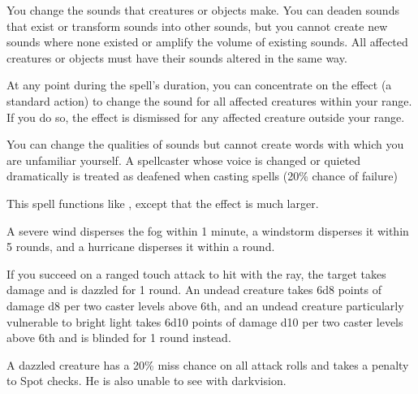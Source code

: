 \spellrng{\rngmed}
\begin{spelleffect}
  You change the sounds that creatures or objects make. You can deaden sounds that exist or transform sounds into other sounds, but you cannot create new sounds where none existed or amplify the volume of existing sounds. All affected creatures or objects must have their sounds altered in the same way.
  
  At any point during the spell's duration, you can concentrate on the effect (a standard action) to change the sound for all affected creatures within your range. If you do so, the effect is dismissed for any affected creature outside your range.
\end{spelleffect}
\begin{spellnotes}
  You can change the qualities of sounds but cannot create words with which you are unfamiliar yourself. A spellcaster whose voice is changed or quieted dramatically is treated as deafened when casting spells (20\% chance of failure)
\end{spellnotes}

\begin{spelleffect}
  This spell functions like , except that the effect is much larger.
\end{spelleffect}
\begin{spellnotes}
  A severe wind disperses the fog within 1 minute, a windstorm disperses it within 5 rounds, and a hurricane disperses it within a round.
\end{spellnotes}

\spellrng{\rngclose}
\begin{spelleffect}
  If you succeed on a ranged touch attack to hit with the ray, the target takes damage and is dazzled for 1 round. An undead creature takes 6d8 points of damage \add d8 per two caster levels above 6th, and an undead creature particularly vulnerable to bright light takes 6d10 points of damage \add d10 per two caster levels above 6th and is blinded for 1 round instead.
\end{spelleffect}
\begin{spellnotes}
  A dazzled creature has a 20\% miss chance on all attack rolls and takes a  penalty to Spot checks. He is also unable to see with darkvision.
\end{spellnotes}

